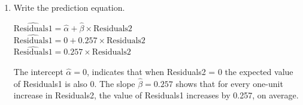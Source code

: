 \documentclass[12pt,letterpaper]{article}
\begin{document}
\begin{enumerate}
		\item Write the prediction equation.
			\begin{center}
			$\widehat{\text {Residuals1}} = \hat{\alpha} + \hat{\beta} \times \text{Residuals2}$ \\ [0.2cm]
			$\widehat{\text {Residuals1}} = 0 + 0.257 \times \text{Residuals2}$ \\ [0.2cm]
			$\widehat{\text {Residuals1}} = 0.257 \times \text{Residuals2}$ 
		\end{center}
		The intercept $\hat{\alpha} = 0$, indicates that when Residuals2 = 0 the expected value of Residuals1 is also 0. The slope $\hat{\beta} = 0.257$ shows that for every one-unit increase in Residuals2, the value of Residuals1 increases by 0.257, on average. 
	\end{enumerate}
	
	\newpage	
\end{document}
